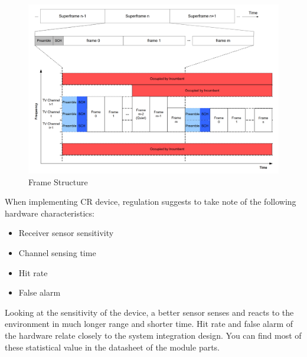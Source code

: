 \begin{figure}[ht]
\centering
\includegraphics[width=14cm]{figures/frame.png}
\caption{Frame Structure \cite{ieee_802_22}}
\label{fig:frame}
\end{figure}

When implementing CR device, regulation suggests to take note of the following hardware characteristics:
\begin{itemize}
  \item Receiver sensor sensitivity 
  \item Channel sensing time
  \item Hit rate
  \item False alarm
\end{itemize}
Looking at the sensitivity of the device, a better sensor senses and reacts to the environment in much longer range and shorter 
time. Hit rate and false alarm of the hardware relate closely to the system integration design. You can find most of these statistical
value in the datasheet of the module parts.
